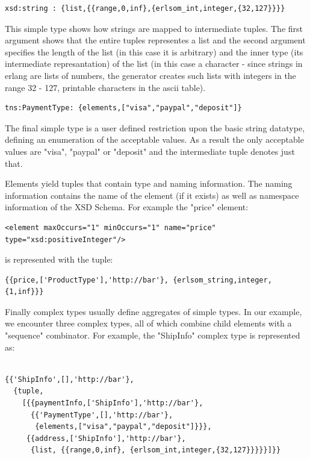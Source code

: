 \documentclass[submission,copyright,a4]{eptcs}
\begin{document}
\begin{lstlisting}
xsd:string : {list,{{range,0,inf},{erlsom_int,integer,{32,127}}}}
\end{lstlisting}

This simple type shows how strings are mapped to intermediate tuples. The first argument shows that the entire tuples representes a list and the second argument specifies the length of the list (in this case it is arbitrary) and the inner type (its intermediate represantation) of the list (in this case a character - since strings in erlang are lists of numbers, the generator creates such lists with integers in the range 32 - 127, printable characters in the ascii table).

\begin{lstlisting}
tns:PaymentType: {elements,["visa","paypal","deposit"]}
\end{lstlisting}

The final simple type is a user defined restriction upon the basic string datatype, defining an enumeration of the acceptable values. As a result the only acceptable values are "visa", "paypal" or "deposit" and the intermediate tuple denotes just that.

Elements yield tuples that contain type and naming information. The naming information contains the name of the element (if it exists) as well as namespace information of the XSD Schema. For example the "price" element:

\begin{lstlisting}
<element maxOccurs="1" minOccurs="1" name="price" type="xsd:positiveInteger"/>
\end{lstlisting}

is represented with the tuple:

\begin{lstlisting}
{{price,['ProductType'],'http://bar'}, {erlsom_string,integer,{1,inf}}}
\end{lstlisting}

Finally complex types usually define aggregates of simple types. In our example, we encounter three complex types, all of which combine child elements with a "sequence" combinator. For example, the "ShipInfo" complex type is represented as:

\begin{lstlisting}

{{'ShipInfo',[],'http://bar'},
  {tuple,
    [{{paymentInfo,['ShipInfo'],'http://bar'},
      {{'PaymentType',[],'http://bar'},
       {elements,["visa","paypal","deposit"]}}},
     {{address,['ShipInfo'],'http://bar'},
      {list, {{range,0,inf}, {erlsom_int,integer,{32,127}}}}}]}}
\end{lstlisting}
\end{document}

